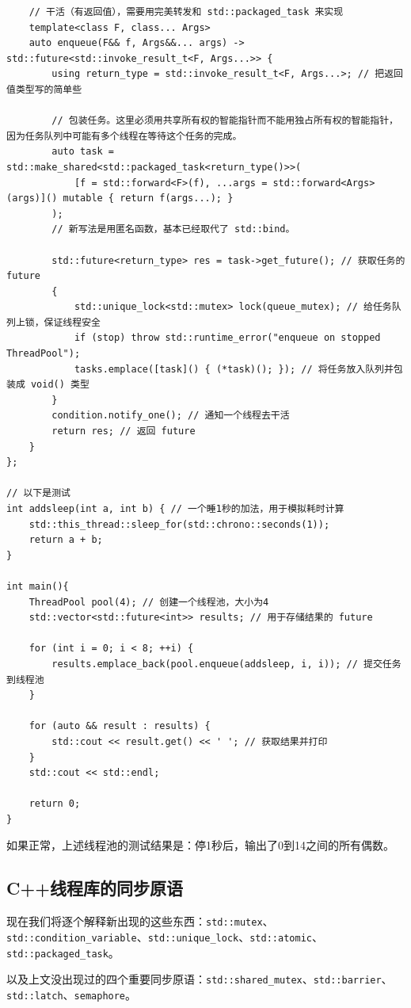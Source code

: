 \begin{verbatim}
    // 干活（有返回值），需要用完美转发和 std::packaged_task 来实现
    template<class F, class... Args>
    auto enqueue(F&& f, Args&&... args) -> std::future<std::invoke_result_t<F, Args...>> {
        using return_type = std::invoke_result_t<F, Args...>; // 把返回值类型写的简单些

        // 包装任务。这里必须用共享所有权的智能指针而不能用独占所有权的智能指针，因为任务队列中可能有多个线程在等待这个任务的完成。
        auto task = std::make_shared<std::packaged_task<return_type()>>(
            [f = std::forward<F>(f), ...args = std::forward<Args>(args)]() mutable { return f(args...); }
        );
        // 新写法是用匿名函数，基本已经取代了 std::bind。
        
        std::future<return_type> res = task->get_future(); // 获取任务的 future
        {
            std::unique_lock<std::mutex> lock(queue_mutex); // 给任务队列上锁，保证线程安全
            if (stop) throw std::runtime_error("enqueue on stopped ThreadPool");
            tasks.emplace([task]() { (*task)(); }); // 将任务放入队列并包装成 void() 类型
        }
        condition.notify_one(); // 通知一个线程去干活
        return res; // 返回 future
    }
};

// 以下是测试 
int addsleep(int a, int b) { // 一个睡1秒的加法，用于模拟耗时计算
    std::this_thread::sleep_for(std::chrono::seconds(1));
    return a + b;
}

int main(){
    ThreadPool pool(4); // 创建一个线程池，大小为4
    std::vector<std::future<int>> results; // 用于存储结果的 future

    for (int i = 0; i < 8; ++i) {
        results.emplace_back(pool.enqueue(addsleep, i, i)); // 提交任务到线程池
    }

    for (auto && result : results) {
        std::cout << result.get() << ' '; // 获取结果并打印
    }
    std::cout << std::endl;

    return 0;
}
\end{verbatim}
如果正常，上述线程池的测试结果是：停1秒后，输出了0到14之间的所有偶数。

\subsection{C++线程库的同步原语}

现在我们将逐个解释新出现的这些东西：\verb|std::mutex|、\verb|std::condition_variable|、\verb|std::unique_lock|、\verb|std::atomic|、\verb|std::packaged_task|。

以及上文没出现过的四个重要同步原语：\verb|std::shared_mutex|、\verb|std::barrier|、\verb|std::latch|、\verb|semaphore|。

